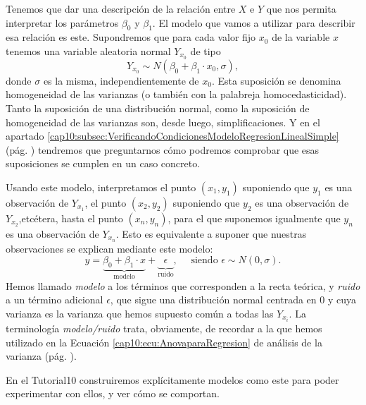 Tenemos que dar una descripción de la relación entre $X$ e $Y$ que nos permita interpretar los
parámetros $\beta_0$ y $\beta_1$. El modelo que vamos a utilizar para describir esa relación es
este.  Supondremos que para cada valor fijo $x_0$ de la variable $x$ tenemos una variable aleatoria
normal $Y_{x_0}$ de tipo
\begin{equation}\label{cap10:ecu:modeloRegresionLinealSimple}
Y_{x_0}\sim N(\beta_0+\beta_1\cdot x_0,\sigma),
\end{equation}
donde $\sigma$ es la misma, independientemente de $x_0$. Esta suposición se denomina {\sf
homogeneidad de las varianzas} (o también con la palabreja
{\sf homocedasticidad}). Tanto la suposición de una
distribución normal, como la suposición de homogeneidad de las varianzas son, desde luego,
simplificaciones. Y en el apartado \ref{cap10:subsec:VerificandoCondicionesModeloRegresionLinealSimple} (pág. \pageref{cap10:subsec:VerificandoCondicionesModeloRegresionLinealSimple}) tendremos que preguntarnos cómo podremos comprobar que esas suposiciones se cumplen en un caso concreto.

Usando este modelo, interpretamos el punto $(x_1,y_1)$ suponiendo que $y_1$ es una observación de
$Y_{x_1}$, el punto $(x_2,y_2)$ suponiendo que $y_2$ es una observación de $Y_{x_2}$,etcétera,
hasta el punto $(x_n,y_n)$, para el que suponemos igualmente que $y_n$ es una observación de
$Y_{x_n}$. Esto es equivalente a suponer que nuestras observaciones se explican mediante este
modelo:
    \begin{equation}\label{cap10:ecu:InterpretacionModeloRegresionLinealSimple}
        y=
        \underbrace{\beta_0 +\beta_1\cdot x}_{\mbox{modelo}}
        +
        \underbrace{\phantom{\beta}\epsilon\phantom{\beta}}_{\mbox{ruido}},
        \quad\mbox{ siendo }\epsilon\sim N(0,\sigma).
    \end{equation}
Hemos llamado {\em modelo} a los términos que corresponden a la recta teórica, y {\em ruido} a un
término adicional $\epsilon$, que sigue una distribución normal centrada en $0$ y cuya varianza es
la varianza que hemos supuesto común a todas las $Y_{x_i}$. La terminología {\em modelo/ruido}
trata, obviamente, de recordar a la que hemos utilizado en la Ecuación
\ref{cap10:ecu:AnovaparaRegresion} de análisis de la varianza (pág.
\pageref{cap10:ecu:AnovaparaRegresion}).

En el Tutorial10 construiremos explícitamente modelos como este para poder experimentar con ellos,
y ver cómo se comportan.


